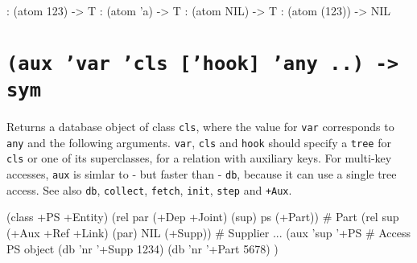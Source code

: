 \begin{wideverbatim}
: (atom 123)
-> T
: (atom 'a)
-> T
: (atom NIL)
-> T
: (atom (123))
-> NIL
\end{wideverbatim}

 
\section*{\texttt{(aux 'var 'cls ['hook] 'any ..) -> sym}}
\label{sec:func-ref-A-(aux 'var 'cls ['hook] 'any ..) -> sym}


Returns a database object of class \texttt{cls}, where the value for \texttt{var}
corresponds to \texttt{any} and the following arguments. \texttt{var}, \texttt{cls} and
\texttt{hook} should specify a \texttt{tree} for \texttt{cls} or one of its superclasses, for
a relation with auxiliary keys. For multi-key accesses, \texttt{aux} is simlar
to - but faster than - \texttt{db}, because it can use a single tree access.
See also \texttt{db}, \texttt{collect}, \texttt{fetch}, \texttt{init}, \texttt{step} and \texttt{+Aux}.


\begin{wideverbatim}
(class +PS +Entity)
(rel par (+Dep +Joint) (sup) ps (+Part))        # Part
(rel sup (+Aux +Ref +Link) (par) NIL (+Supp))   # Supplier
...
   (aux 'sup '+PS                               # Access PS object
      (db 'nr '+Supp 1234)
      (db 'nr '+Part 5678) )
\end{wideverbatim}


